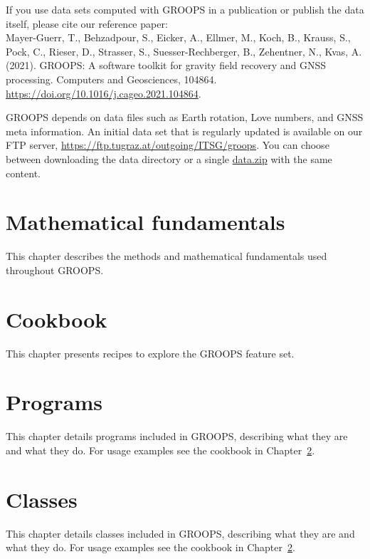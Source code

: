 \documentclass[10pt,twoside,titlepage]{report}
\begin{document}
If you use data sets computed with GROOPS in a publication or publish the data itself, please cite our reference paper:\\
Mayer-Guerr, T., Behzadpour, S., Eicker, A., Ellmer, M., Koch, B., Krauss, S., Pock, C., Rieser, D., Strasser, S., Suesser-Rechberger,
B., Zehentner, N., Kvas, A. (2021). GROOPS: A software toolkit for gravity field recovery and GNSS processing.
Computers and Geosciences, 104864. \url{https://doi.org/10.1016/j.cageo.2021.104864}.

GROOPS depends on data files such as Earth rotation, Love numbers, and GNSS meta information.
An initial data set that is regularly updated is available on our FTP server,
\url{https://ftp.tugraz.at/outgoing/ITSG/groops}. You can choose between downloading the data directory
or a single \href{https://ftp.tugraz.at/outgoing/ITSG/groops/data.zip}{data.zip} with the same content.


\clearpage

\clearpage

\clearpage

\clearpage

\clearpage

\clearpage


\clearpage

\chapter{Mathematical fundamentals}
This chapter describes the methods and mathematical fundamentals used throughout GROOPS.

\clearpage

\clearpage


\chapter{Cookbook}\label{general.cookbook}
This chapter presents recipes to explore the GROOPS feature set.

\clearpage

\clearpage

\clearpage

\clearpage

\clearpage

\clearpage


\chapter{Programs}\label{programType}
This chapter details programs included in GROOPS, describing what they are and what they do. For usage examples see the cookbook in Chapter~\ref{general.cookbook}.


\chapter{Classes}\label{classes}
This chapter details classes included in GROOPS, describing what they are and what they do. For usage examples see the cookbook in Chapter~\ref{general.cookbook}.

\end{document}
